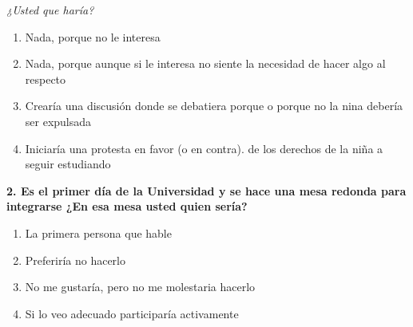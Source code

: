\documentclass{article}
\begin{document}
\emph{¿Usted que haría?}\\
\begin{enumerate}[label=(\Alph*)]
\item Nada, porque no le interesa
\item Nada, porque aunque si le interesa no siente la necesidad de hacer algo al respecto
\item Crearía una discusión donde se debatiera porque o porque no la nina debería ser expulsada 
\item Iniciaría una protesta en favor (o en contra). de los derechos de la niña a seguir estudiando
 \end{enumerate}

\textbf{ 2. Es el primer día de la Universidad y se hace una mesa redonda para integrarse ¿En esa mesa usted quien sería?}
\begin{enumerate}[label=(\Alph*)] 
\item La primera persona que hable
\item Preferiría no hacerlo
\item No me gustaría, pero no me molestaria hacerlo
\item Si lo veo adecuado participaría activamente
\end{enumerate}
\end{document}
